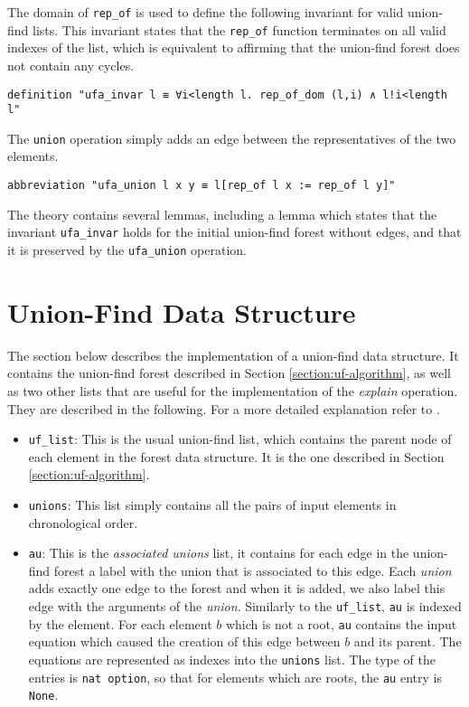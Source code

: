 The domain of \lstinline{rep_of} is used to define the following invariant for valid union-find lists. This invariant states that the \lstinline{rep_of} function terminates on all valid indexes of the list, which is equivalent to affirming that the union-find forest does not contain any cycles.

\begin{lstlisting}
definition "ufa_invar l ≡ ∀i<length l. rep_of_dom (l,i) ∧ l!i<length l"
\end{lstlisting}

The \lstinline{union} operation simply adds an edge between the representatives of the two elements.

\begin{lstlisting}
abbreviation "ufa_union l x y ≡ l[rep_of l x := rep_of l y]"
\end{lstlisting}

The theory contains several lemmas, including a lemma which states that the invariant \lstinline{ufa_invar} holds for the initial union-find forest without edges, and that it is preserved by the \lstinline{ufa_union} operation.

\section{Union-Find Data Structure}
\label{section:uf-data}

The section below describes the implementation of a union-find data structure.
It contains the union-find forest described in Section \ref{section:uf-algorithm}, as well as two other lists that are useful for the implementation of the \emph{explain} operation. They are described in the following. For a more detailed explanation refer to \cite{Nieuwenhuis}.

\begin{itemize}
	\item \lstinline{uf_list}: This is the usual union-find list, which contains the parent node of each element in the forest data structure. It is the one described in Section \ref{section:uf-algorithm}.

	\item \lstinline{unions}: This list simply contains all the pairs of input elements in chronological order.

	\item \lstinline{au}: This is the \emph{associated unions} list, it contains for each edge in the union-find forest a label with the union that is associated to this edge. Each \emph{union} adds exactly one edge to the forest and when it is added, we also label this edge with the arguments of the \emph{union}. Similarly to the \lstinline{uf_list}, \lstinline|au| is indexed by the element. For each element $b$ which is not a root, \lstinline{au} contains the input equation which caused the creation of this edge between $b$ and its parent. The equations are represented as indexes into the \lstinline{unions} list. The type of the entries is \lstinline{nat option}, so that for elements which are roots, the \lstinline{au} entry is \lstinline{None}.
\end{itemize}

